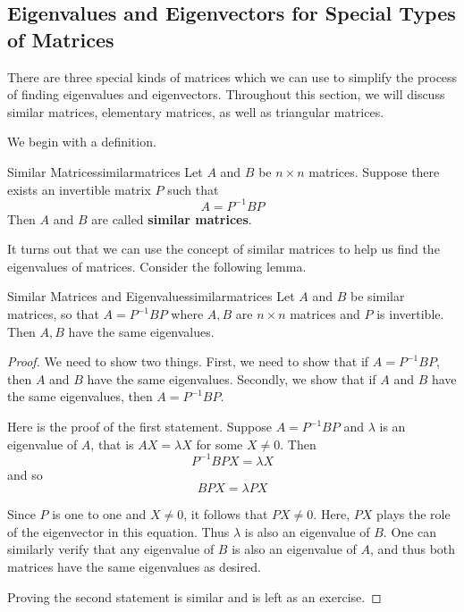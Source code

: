 \subsection{Eigenvalues and Eigenvectors for Special Types of Matrices}

There are three special kinds of matrices which we can use to simplify the process of finding eigenvalues and eigenvectors. 
Throughout this section, we will discuss similar matrices, elementary matrices, as well as triangular matrices. 

We begin with a definition.

\begin{definition}{Similar Matrices}{similarmatrices}
Let $A$ and $B$ be $n \times n$ matrices. Suppose there exists an invertible matrix $P$ such that 
\begin{equation*}
A = P^{-1}BP
\end{equation*}
Then $A$ and $B$ are called \textbf{similar matrices}.
\end{definition}

It turns out that we can use the concept of similar matrices to help us find the eigenvalues
of matrices. Consider the following lemma.

\begin{lemma}{Similar Matrices and Eigenvalues}{similarmatrices}
Let $A$ and $B$ be similar matrices, so that $A=P^{-1}BP$ where $A,B$ are $n\times n$ matrices and $P$ is invertible. Then $A,B$ have the
same eigenvalues.
\end{lemma}

\begin{proof}
We need to show two things. First, we need to show that if
$A=P^{-1}BP$, then $A$ and $B$ have the same eigenvalues.  Secondly,
we show that if $A$ and $B$ have the same eigenvalues, then
$A=P^{-1}BP$.

Here is the proof of the first statement. 
Suppose $A = P^{-1}BP$ and $\lambda$ is an eigenvalue of $A$, that is $AX=\lambda X$ for some $X\neq 0.$ Then
\begin{equation*}
P^{-1}BPX=\lambda X
\end{equation*}
and so
\begin{equation*}
BPX=\lambda PX
\end{equation*}

Since $P$ is one to one and $X \neq 0$, it follows that $PX \neq
0$. Here, $PX$ plays the role of the eigenvector in this equation.
Thus $\lambda$ is also an eigenvalue of $B$. One can similarly verify
that any eigenvalue of $B$ is also an eigenvalue of $A$, and thus both
matrices have the same eigenvalues as desired.

Proving the second statement is similar and is left as an exercise. 
\end{proof}

